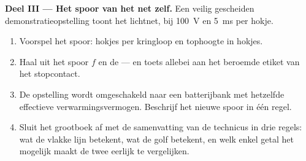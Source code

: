 \begin{problem}
\medskip\noindent\textbf{Deel III --- Het spoor van het net zelf.}
Een veilig gescheiden demonstratieopstelling toont het lichtnet, bij
\qty{100}{V} en \qty{5}{ms} per hokje.
\begin{enumerate}[resume]
  \item Voorspel het spoor: hokjes per kringloop en tophoogte in
        hokjes.
  \item Haal uit het spoor $f$ en de  --- en
        toets allebei aan het beroemde etiket van het stopcontact.
  \item De opstelling wordt omgeschakeld naar een batterijbank met
        hetzelfde effectieve verwarmingsvermogen. Beschrijf het nieuwe
        spoor in één regel.
  \item Sluit het grootboek af met de samenvatting van de technicus in
        drie regels: wat de vlakke lijn betekent, wat de golf betekent,
        en welk enkel getal het mogelijk maakt de twee eerlijk te
        vergelijken.
\end{enumerate}
\end{problem}
